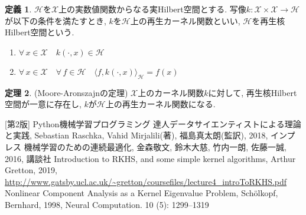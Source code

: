 \documentclass[uplatex]{jsarticle}
\theoremstyle{definition}
\newtheorem{definition}{定義}[section]
\newtheorem{theorem}[definition]{定理}
\numberwithin{equation}{section}
\begin{document}
\begin{definition}
    $\mathcal{H}$を$\mathcal{X}$上の実数値関数からなる実Hilbert空間とする.
    写像$k \colon \mathcal{X} \times \mathcal{X} \to \mathcal{H}$が以下の条件を満たすとき, $k$を$\mathcal{H}$上の再生カーネル関数といい, $\mathcal{H}$を再生核Hilbert空間という.
    \begin{enumerate}
        \item
        $\forall \, x \in \mathcal{X} \quad k(\cdot, x) \in \mathcal{H}$
        \item
        $\forall \, x \in \mathcal{X} \quad \forall \, f \in \mathcal{H} \quad \langle f, k(\cdot, x) \rangle_{\mathcal{H}} = f(x)$
    \end{enumerate}
\end{definition}

\begin{theorem}
    (Moore-Aronszajnの定理)
    $\mathcal{X}$上のカーネル関数$k$に対して, 再生核Hilbert空間が一意に存在し, $k$が$\mathcal{H}$上の再生カーネル関数になる.
\end{theorem}

\begin{thebibliography}{9}
    [第2版] Python機械学習プログラミング 達人データサイエンティストによる理論と実践, Sebastian Raschka, Vahid Mirjalili(著), 福島真太朗(監訳), 2018, インプレス
    機械学習のための連続最適化, 金森敬文, 鈴木大慈, 竹内一朗, 佐藤一誠, 2016, 講談社
    Introduction to RKHS, and some simple kernel algorithms, Arthur Gretton, 2019, \url{http://www.gatsby.ucl.ac.uk/~gretton/coursefiles/lecture4_introToRKHS.pdf}
    Nonlinear Component Analysis as a Kernel Eigenvalue Problem, Sch\"{o}lkopf, Bernhard, 1998, Neural Computation. 10 (5): 1299–1319
\end{thebibliography}
\end{document}

